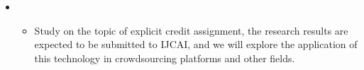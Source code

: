 \begin{itemize}[leftmargin=*]
  \item
        {\small
          \begin{itemize}
            \item Study on the topic of explicit credit assignment, the research results are expected to be submitted to IJCAI, and we will explore the application of this technology in crowdsourcing platforms and other fields.
          \end{itemize}
        }
\end{itemize}